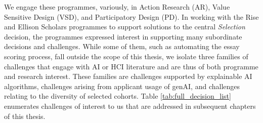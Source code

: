 We engage these programmes, variously, in Action Research (AR), Value Sensitive Design (VSD), and Participatory Design (PD). In working with the Rise and Ellison Scholars programmes to support solutions to the central \emph{Selection} decision, the programmes expressed interest in supporting many subordinate decisions and challenges. While some of them, such as automating the essay scoring process, fall outside the scope of this thesis, we isolate three families of challenges that engage with AI or HCI literature and are thus of both programme and research interest. These families are challenges supported by explainable AI algorithms, challenges arising from applicant usage of genAI, and challenges relating to the diversity of selected cohorts. Table \ref{tab:full_decision_list} enumerates challenges of interest to us that are addressed in subsequent chapters of this thesis.
